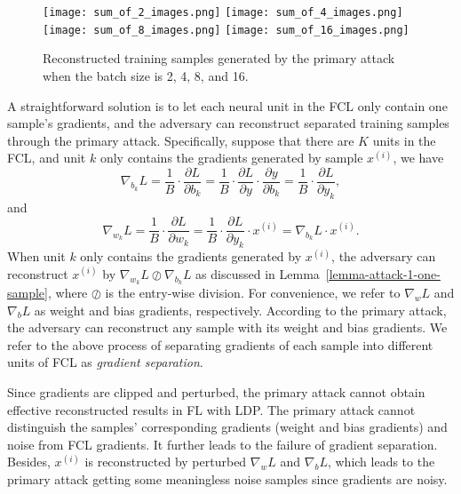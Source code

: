\documentclass[lettersize,journal]{IEEEtran}
\begin{document}
\begin{figure}
\centering
\texttt{[image: sum\_of\_2\_images.png]}
\texttt{[image: sum\_of\_4\_images.png]}
\texttt{[image: sum\_of\_8\_images.png]}
\texttt{[image: sum\_of\_16\_images.png]}
\caption{Reconstructed training samples generated by the primary attack when the batch size is 2, 4, 8, and 16.}
\label{fig-attack-example-multiples-sum}
\end{figure}

A straightforward solution is to let each neural unit in the FCL only contain one sample's gradients, and the adversary can reconstruct separated training samples through the primary attack. Specifically, suppose that there are $K$ units in the FCL, and unit $k$ only contains the gradients generated by sample $x^{\left(i\right)}$, we have
\begin{equation}
\nabla_{b_k} L = \frac{1}{B} \cdot \frac{\partial L }{\partial b_k} = \frac{1}{B} \cdot \frac{\partial L }{\partial y} \cdot \frac{\partial y}{\partial b_k} = \frac{1}{B} \cdot \frac{\partial L}{ \partial y_k},
\end{equation}
and 
\begin{equation}
\nabla_{w_k} L = \frac{1}{B} \cdot \frac{\partial L }{\partial w_k} = \frac{1}{B} \cdot \frac{\partial L}{\partial y_k} \cdot x^{\left( i \right)} = \nabla_{b_k} L \cdot x^{\left( i \right)}.
\end{equation}
When unit $k$ only contains the gradients generated by $x^{\left(i\right)}$, the adversary can reconstruct $x^{\left( i \right)}$ by $\nabla_{w_k} L \oslash \nabla_{b_k} L$ as discussed in Lemma~\ref{lemma-attack-1-one-sample}, where $\oslash$ is the entry-wise division. For convenience, we refer to $\nabla_w L$ and $\nabla_b L$ as weight and bias gradients, respectively. According to the primary attack, the adversary can reconstruct any sample with its weight and bias gradients. We refer to the above process of separating gradients of each sample into different units of FCL as \textit{gradient separation}.

Since gradients are clipped and perturbed, the primary attack cannot obtain effective reconstructed results in FL with LDP. The primary attack cannot distinguish the samples’ corresponding gradients (weight and bias gradients) and noise from FCL gradients. It further leads to the failure of gradient separation. Besides, $x^{\left( i \right)}$ is reconstructed by perturbed $\nabla_w L$ and $\nabla_b L$, which leads to the primary attack getting some meaningless noise samples since gradients are noisy.
\end{document}
